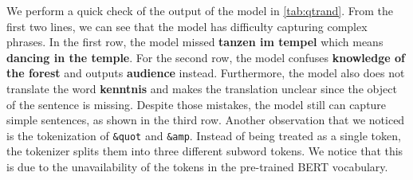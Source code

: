We perform a quick check of the output of the model in \cref{tab:qtrand}. From the first two lines, we can see that the model has difficulty capturing complex phrases. In the first row, the model missed \textbf{tanzen im tempel} which means \textbf{dancing in the temple}. For the second row, the model confuses \textbf{knowledge of the forest} and outputs \textbf{audience} instead. Furthermore, the model also does not translate the word \textbf{kenntnis} and makes the translation unclear since the object of the sentence is missing. Despite those mistakes, the model still can capture simple sentences, as shown in the third row. Another observation that we noticed is the tokenization of \texttt{\&quot\;} and \texttt{\&amp\;}. Instead of being treated as a single token, the tokenizer splits them into three different subword tokens. We notice that this is due to the unavailability of the tokens in the pre-trained BERT vocabulary.

